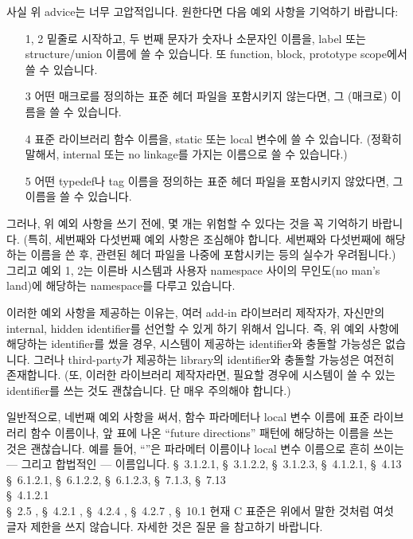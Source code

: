 \begin{faq}
        사실 위 advice는 너무 고압적입니다. 원한다면 다음 예외 사항을
        기억하기 바랍니다:

        \begin{itemize}
        \item[1, 2] 밑줄로 시작하고, 두 번째 문자가 숫자나 소문자인 이름을,
          label 또는 structure/union 이름에 쓸 수 있습니다. 또 function,
          block, prototype scope에서 쓸 수 있습니다.
        \item[3] 어떤 매크로를 정의하는 표준 헤더 파일을 포함시키지 않는다면,
          그 (매크로) 이름을 쓸 수 있습니다.
        \item[4] 표준 라이브러리 함수 이름을, static 또는 local 변수에
          쓸 수 있습니다. (정확히 말해서, internal 또는 no linkage를 가지는
          이름으로 쓸 수 있습니다.)
        \item[5] 어떤 typedef나 tag 이름을 정의하는 표준 헤더 파일을 포함시키지
          않았다면, 그 이름을 쓸 수 있습니다.
        \end{itemize}
        
        \noindent 그러나, 위 예외 사항을 쓰기 전에, 몇 개는 위험할 수 있다는
        것을 꼭 기억하기 바랍니다. (특히, 세번째와 다섯번째 예외 사항은 조심해야
        합니다. 세번째와 다섯번째에 해당하는 이름을 쓴 후, 관련된 헤더 파일을
        나중에 포함시키는 등의 실수가 우려됩니다.) 그리고 예외 1, 2는
        이른바 시스템과 사용자 namespace 사이의 무인도(no man's land)에
        해당하는 namespace를 다루고 있습니다.

        이러한 예외 사항을 제공하는 이유는, 여러 add-in 라이브러리 제작자가,
        자신만의 internal, hidden identifier를 선언할 수 있게 하기 위해서
        입니다. 즉, 위 예외 사항에 해당하는 identifier를 썼을 경우, 시스템이
        제공하는 identifier와 충돌할 가능성은 없습니다. 그러나 third-party가
        제공하는 library의 identifier와 충돌할 가능성은 여전히 존재합니다.
        (또, 이러한 라이브러리 제작자라면, 필요할 경우에 시스템이 쓸 수 있는
        identifier를 쓰는 것도 괜찮습니다. 단 매우 주의해야 합니다.)

        일반적으로, 네번째 예외 사항을 써서, 함수 파라메터나 local 변수 이름에
        표준 라이브러리 함수 이름이나, 앞 표에 나온 ``future directions'' 패턴에
        해당하는 이름을 쓰는 것은 괜찮습니다. 예를 들어, ``''은
        파라메터 이름이나 local 변수 이름으로 흔히 쓰이는 --- 그리고 합법적인 
        --- 이름입니다.
\R
	\cite{ansi} \S\ 3.1.2.1, \S\ 3.1.2.2, \S\ 3.1.2.3, 
                    \S\ 4.1.2.1, \S\ 4.13 \\
        \cite{c89} \S\ 6.1.2.1, \S\ 6.1.2.2, \S\ 6.1.2.3, 
                   \S\ 7.1.3, \S\ 7.13 \\
        \cite{rationale} \S\ 4.1.2.1 \\
        \cite{hs} \S\ 2.5 , \S\ 4.2.1 ,
                  \S\ 4.2.4 , \S\ 4.2.7 , 
                  \S\ 10.1 
\T
	현재 C 표준은 위에서 말한 것처럼 여섯 글자 제한을 쓰지 않습니다.
        자세한 것은 질문 을 참고하기 바랍니다.
\end{faq}

